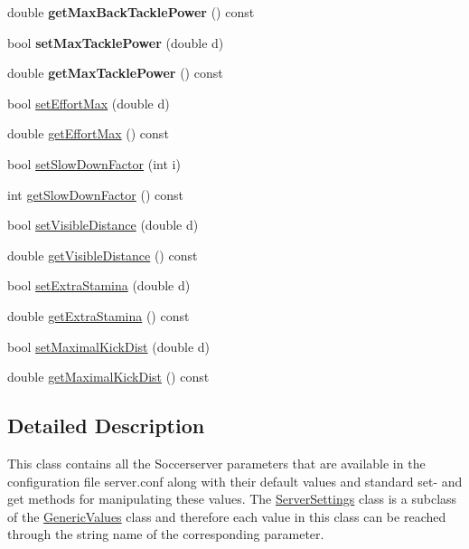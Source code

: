 \begin{DoxyCompactItemize}
\item 
double {\bfseries get\+Max\+Back\+Tackle\+Power} () const \hypertarget{classServerSettings_ae790a11cc35650fa33802d6a6d01884e}{}\label{classServerSettings_ae790a11cc35650fa33802d6a6d01884e}

\item 
bool {\bfseries set\+Max\+Tackle\+Power} (double d)\hypertarget{classServerSettings_acb4d369d51360ed9de9b000779392497}{}\label{classServerSettings_acb4d369d51360ed9de9b000779392497}

\item 
double {\bfseries get\+Max\+Tackle\+Power} () const \hypertarget{classServerSettings_a12b8bd1281e041915a1c38a9fa4cd80f}{}\label{classServerSettings_a12b8bd1281e041915a1c38a9fa4cd80f}

\item 
bool \hyperlink{classServerSettings_a6ba0242ad271bef0a6dc8bdbaedca21c}{set\+Effort\+Max} (double d)
\item 
double \hyperlink{classServerSettings_a85a4630574356df9699acde5d301219a}{get\+Effort\+Max} () const 
\item 
bool \hyperlink{classServerSettings_a1b2850fc9560f80077db4f8ad8649551}{set\+Slow\+Down\+Factor} (int i)
\item 
int \hyperlink{classServerSettings_a5a0910122c8f615000415028de44486a}{get\+Slow\+Down\+Factor} () const 
\item 
bool \hyperlink{classServerSettings_a64a83991ccddb3376afe4058b34b54ed}{set\+Visible\+Distance} (double d)
\item 
double \hyperlink{classServerSettings_a88b3758c43e7d6f5b262adea2a1c5377}{get\+Visible\+Distance} () const 
\item 
bool \hyperlink{classServerSettings_aa218d1b32cd7a4f4542d0fc4c0febb1c}{set\+Extra\+Stamina} (double d)
\item 
double \hyperlink{classServerSettings_a2e11ef6c20c038fe9efdd3365107109e}{get\+Extra\+Stamina} () const 
\item 
bool \hyperlink{classServerSettings_a165f3c5d847ff5d089bb3f9b3ed533a0}{set\+Maximal\+Kick\+Dist} (double d)
\item 
double \hyperlink{classServerSettings_af2efd28299ebf01ef1838065e78ebfac}{get\+Maximal\+Kick\+Dist} () const 
\end{DoxyCompactItemize}


\subsection{Detailed Description}
This class contains all the Soccerserver parameters that are available in the configuration file \textquotesingle{}server.\+conf\textquotesingle{} along with their default values and standard set-\/ and get methods for manipulating these values. The \hyperlink{classServerSettings}{Server\+Settings} class is a subclass of the \hyperlink{classGenericValues}{Generic\+Values} class and therefore each value in this class can be reached through the string name of the corresponding parameter. 

